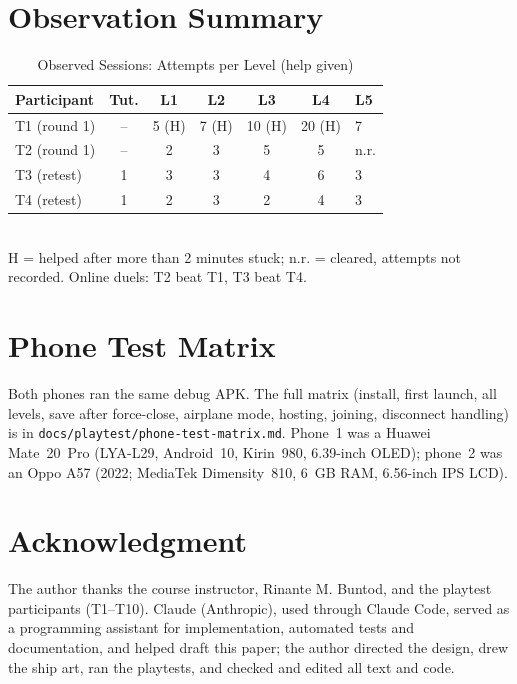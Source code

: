 \documentclass[conference]{IEEEtran}
\begin{document}
\section{Observation Summary}
\begin{table}[h]
\caption{Observed Sessions: Attempts per Level (help given)}
\label{tab:obs}
\centering
\footnotesize
\begin{tabular}{@{}lcccccl@{}}
\toprule
Participant & Tut. & L1 & L2 & L3 & L4 & L5 \\
\midrule
T1 (round 1) & -- & 5 (H) & 7 (H) & 10 (H) & 20 (H) & 7 \\
T2 (round 1) & -- & 2 & 3 & 5 & 5 & n.r. \\
T3 (retest) & 1 & 3 & 3 & 4 & 6 & 3 \\
T4 (retest) & 1 & 2 & 3 & 2 & 4 & 3 \\
\bottomrule
\end{tabular}\\[2pt]
{\scriptsize H = helped after more than 2 minutes stuck; n.r. = cleared, attempts not recorded. Online duels: T2 beat T1, T3 beat T4.}
\end{table}

\section{Phone Test Matrix}
Both phones ran the same debug APK. The full matrix (install, first launch, all levels, save after force-close, airplane mode, hosting, joining, disconnect handling) is in \texttt{docs/playtest/phone-test-matrix.md}. Phone~1 was a Huawei Mate~20~Pro (LYA-L29, Android~10, Kirin~980, 6.39-inch OLED); phone~2 was an Oppo A57 (2022; MediaTek Dimensity~810, 6~GB RAM, 6.56-inch IPS LCD).

\section*{Acknowledgment}
The author thanks the course instructor, Rinante M. Buntod, and the playtest participants (T1--T10). Claude (Anthropic), used through Claude Code, served as a programming assistant for implementation, automated tests and documentation, and helped draft this paper; the author directed the design, drew the ship art, ran the playtests, and checked and edited all text and code.
\end{document}
